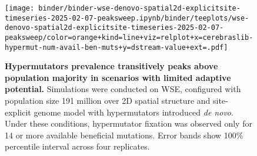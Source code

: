 \begin{figure}

\begin{minipage}{0.4\textwidth}
\texttt{[image: binder/binder-wse-denovo-spatial2d-explicitsite-timeseries-2025-02-07-peaksweep.ipynb/binder/teeplots/wse-denovo-spatial2d-explicitsite-timeseries-2025-02-07-peaksweep/color=orange+kind=line+viz=relplot+x=cerebraslib-hypermut-num-avail-ben-muts+y=dstream-value+ext=.pdf]}
\end{minipage}
\begin{minipage}{0.55\textwidth}
\caption{
\textbf{Hypermutators prevalence transitively peaks above population majority in scenarios with limited adaptive potential.}
\footnotesize
Simulations were conducted on WSE, configured with population size 191 million over 2D spatial structure and site-explicit genome model with hypermutators introduced \textit{de novo}.
Under these conditions, hypermutator fixation was observed only for 14 or more available beneficial mutations.
Error bands show 100\% percentile interval across four replicates.
}
\label{fig:peaksweep}
\end{minipage}
\end{figure}
